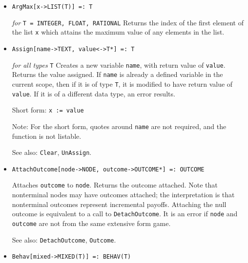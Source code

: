 \begin{itemize}
\item{} 
\protect \large \begin{verbatim}
ArgMax[x->LIST(T)] =: T 
\end{verbatim} \normalsize

{\it for} {\tt T = INTEGER, FLOAT, RATIONAL} 
\bd 
Returns the index of the first element of the list \verb+x+ which
attains the maximum value of any elements in the list.  
\ed

\item{} 
\protect \large \begin{verbatim}
Assign[name->TEXT, value<->T*] =: T
\end{verbatim} \normalsize

{\it for all types} {\tt T} 
\bd 
Creates a new variable \verb+name+, with return value of \verb+value+.
Returns the value assigned.  If \verb+name+ is already a defined
variable in the current scope, then if it is of type \verb+T+, it is
modified to have return value of \verb+value+.  If it is of a
different data type, an error results.
 
\item [Short form:] \verb+x := value+
\item [Note:] For the short form, quotes around \verb+name+ are not
required, and the function is not listable.
\item [See also:] \verb+Clear+, \verb+UnAssign+.
\ed

\item{}
\protect \large \begin{verbatim} 
AttachOutcome[node->NODE, outcome->OUTCOME*] =: OUTCOME
\end{verbatim}\normalsize

\bd
Attaches \verb+outcome+ to \verb+node+.  Returns the outcome attached.
Note that nonterminal nodes may have outcomes attached; the interpretation
is that nonterminal outcomes represent incremental payoffs.  Attaching
the null outcome is equivalent to a call to \verb+DetachOutcome+.  It is
an error if \verb+node+ and \verb+outcome+ are not from the same
extensive form game.
\item [See also:] \verb+DetachOutcome+, \verb+Outcome+.
\ed


\item{}
\protect \large \begin{verbatim}
Behav[mixed->MIXED(T)] =: BEHAV(T)
\end{verbatim}\normalsize


\end{itemize}
